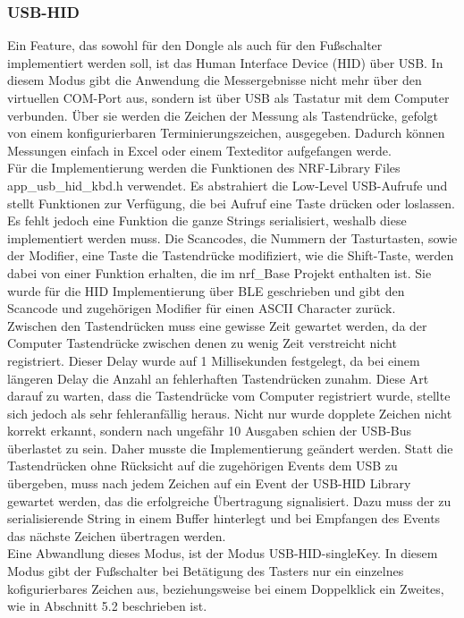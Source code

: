 \subsubsection{USB-HID}
Ein Feature, das sowohl für den Dongle als auch für den Fußschalter implementiert werden soll, ist das Human Interface Device (HID) über USB. In diesem Modus gibt die Anwendung die Messergebnisse nicht mehr über den virtuellen COM-Port aus, sondern ist über USB als Tastatur mit dem Computer verbunden. Über sie werden die Zeichen der Messung als Tastendrücke, gefolgt von einem konfigurierbaren Terminierungszeichen, ausgegeben. Dadurch können Messungen einfach in Excel oder einem Texteditor aufgefangen werde.\\
Für die Implementierung werden die Funktionen des NRF-Library Files app\_usb\_hid\_kbd.h verwendet. Es abstrahiert die Low-Level USB-Aufrufe und stellt Funktionen zur Verfügung, die bei Aufruf eine Taste drücken oder loslassen. Es fehlt jedoch eine Funktion die ganze Strings serialisiert, weshalb diese implementiert werden muss. Die Scancodes, die Nummern der Tasturtasten, sowie der Modifier, eine Taste die Tastendrücke modifiziert, wie die Shift-Taste, werden dabei von einer Funktion erhalten, die im nrf\_Base Projekt enthalten ist. Sie wurde für die \ac{HID} Implementierung über \ac{BLE} geschrieben und gibt den Scancode und zugehörigen Modifier für einen \ac{ASCII} Character zurück.\\
Zwischen den Tastendrücken muss eine gewisse Zeit gewartet werden, da der Computer Tastendrücke zwischen denen zu wenig Zeit verstreicht nicht registriert. Dieser Delay wurde auf 1 Millisekunden festgelegt, da bei einem längeren Delay die Anzahl an fehlerhaften Tastendrücken zunahm. Diese Art darauf zu warten, dass die Tastendrücke vom Computer registriert wurde, stellte sich jedoch als sehr fehleranfällig heraus. Nicht nur wurde dopplete Zeichen nicht korrekt erkannt, sondern nach ungefähr 10 Ausgaben schien der USB-Bus überlastet zu sein. Daher musste die Implementierung geändert werden. Statt die Tastendrücken ohne Rücksicht auf die zugehörigen Events dem USB zu übergeben, muss nach jedem Zeichen auf ein Event der USB-\ac{HID} Library gewartet werden, das die erfolgreiche Übertragung signalisiert. Dazu muss der zu serialisierende String in einem Buffer hinterlegt und bei Empfangen des Events das nächste Zeichen übertragen werden.\\
Eine Abwandlung dieses Modus, ist der Modus USB-\ac{HID}-singleKey. In diesem Modus gibt der Fußschalter bei Betätigung des Tasters nur ein einzelnes kofigurierbares Zeichen aus, beziehungsweise bei einem Doppelklick ein Zweites, wie in Abschnitt 5.2 beschrieben ist.

